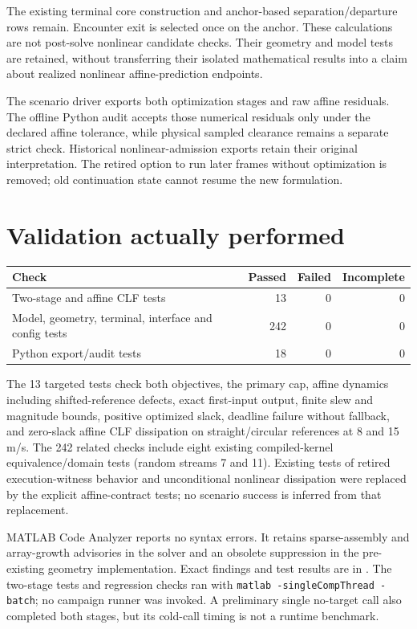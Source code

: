 \documentclass[11pt]{article}
\begin{document}
The existing terminal core construction and anchor-based separation/departure
rows remain. Encounter exit is selected once on the anchor. These calculations
are not post-solve nonlinear candidate checks. Their geometry and model tests
are retained, without transferring their isolated mathematical results into a
claim about realized nonlinear affine-prediction endpoints.

The scenario driver exports both optimization stages and raw affine residuals.
The offline Python audit accepts those numerical residuals only under the
declared affine tolerance, while physical sampled clearance remains a separate
strict check. Historical nonlinear-admission exports retain their original
interpretation. The retired option to run later frames without optimization is
removed; old continuation state cannot resume the new formulation.

\section{Validation actually performed}
\begin{center}
\begin{tabular}{lrrr}\toprule
Check & Passed & Failed & Incomplete \\\midrule
Two-stage and affine CLF tests & 13 & 0 & 0 \\
Model, geometry, terminal, interface and config tests & 242 & 0 & 0 \\
Python export/audit tests & 18 & 0 & 0 \\\bottomrule
\end{tabular}
\end{center}
The 13 targeted tests check both objectives, the primary cap, affine dynamics
including shifted-reference defects, exact first-input output, finite slew and
magnitude bounds, positive optimized slack, deadline failure without fallback,
and zero-slack affine CLF dissipation on straight/circular references at
8 and 15 m/s. The 242 related checks include eight existing compiled-kernel
equivalence/domain tests (random streams 7 and 11). Existing tests of retired
execution-witness behavior and unconditional nonlinear dissipation were replaced
by the explicit affine-contract tests; no scenario success is inferred from
that replacement.

MATLAB Code Analyzer reports no syntax errors. It retains sparse-assembly and
array-growth advisories in the solver and an obsolete suppression in the
pre-existing geometry implementation. Exact findings and test results are in
. The two-stage tests and regression
checks ran with \texttt{matlab -singleCompThread -batch}; no campaign runner was
invoked. A preliminary single no-target call also completed both stages, but
its cold-call timing is not a runtime benchmark.
\end{document}
